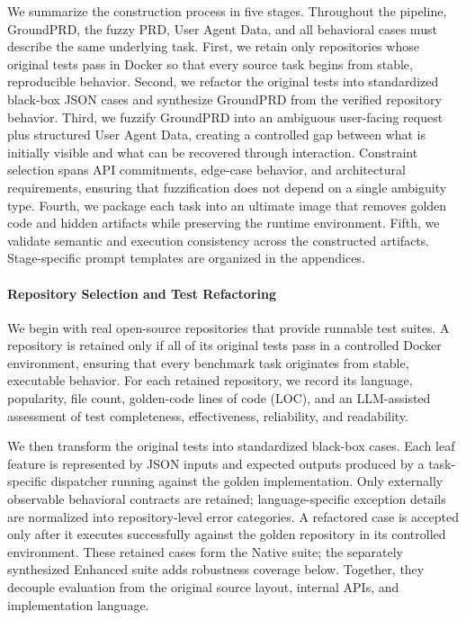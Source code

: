 We summarize the construction process in five stages. Throughout the pipeline, GroundPRD, the fuzzy PRD, User Agent Data, and all behavioral cases must describe the same underlying task. First, we retain only repositories whose original tests pass in Docker so that every source task begins from stable, reproducible behavior. Second, we refactor the original tests into standardized black-box JSON cases and synthesize GroundPRD from the verified repository behavior. Third, we fuzzify GroundPRD into an ambiguous user-facing request plus structured User Agent Data, creating a controlled gap between what is initially visible and what can be recovered through interaction. Constraint selection spans API commitments, edge-case behavior, and architectural requirements, ensuring that fuzzification does not depend on a single ambiguity type. Fourth, we package each task into an ultimate image that removes golden code and hidden artifacts while preserving the runtime environment. Fifth, we validate semantic and execution consistency across the constructed artifacts. Stage-specific prompt templates are organized in the appendices.

\paragraph{Repository Selection and Test Refactoring}
We begin with real open-source repositories that provide runnable test suites. A repository is retained only if all of its original tests pass in a controlled Docker environment, ensuring that every benchmark task originates from stable, executable behavior. For each retained repository, we record its language, popularity, file count, golden-code lines of code (LOC), and an LLM-assisted assessment of test completeness, effectiveness, reliability, and readability.

We then transform the original tests into standardized black-box cases. Each leaf feature is represented by JSON inputs and expected outputs produced by a task-specific dispatcher running against the golden implementation. Only externally observable behavioral contracts are retained; language-specific exception details are normalized into repository-level error categories. A refactored case is accepted only after it executes successfully against the golden repository in its controlled environment. These retained cases form the Native suite; the separately synthesized Enhanced suite adds robustness coverage below. Together, they decouple evaluation from the original source layout, internal APIs, and implementation language.

